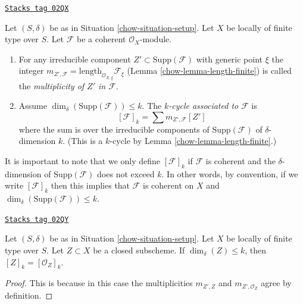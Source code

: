 \begin{definition}
\label{chow-definition-cycle-associated-to-coherent-sheaf}
\href{https://stacks.math.columbia.edu/tag/02QX}{\texttt{Stacks tag 02QX}}

Let $(S, \delta)$ be as in Situation \ref{chow-situation-setup}.
Let $X$ be locally of finite type over $S$.
Let $\mathcal{F}$ be a coherent $\mathcal{O}_X$-module.
\begin{enumerate}
\item For any irreducible component $Z' \subset \text{Supp}(\mathcal{F})$
with generic point $\xi$ the integer
$m_{Z', \mathcal{F}} = \text{length}_{\mathcal{O}_{X, \xi}} \mathcal{F}_\xi$
(Lemma \ref{chow-lemma-length-finite})
is called the {\it multiplicity of $Z'$ in $\mathcal{F}$}.
\item Assume $\dim_\delta(\text{Supp}(\mathcal{F})) \leq k$.
The {\it $k$-cycle associated to $\mathcal{F}$} is
$$
[\mathcal{F}]_k
=
\sum m_{Z', \mathcal{F}}[Z']
$$
where the sum is over the irreducible components of
$\text{Supp}(\mathcal{F})$ of $\delta$-dimension $k$.
(This is a $k$-cycle by Lemma \ref{chow-lemma-length-finite}.)
\end{enumerate}
\end{definition}

It is important to note that we only define $[\mathcal{F}]_k$
if $\mathcal{F}$ is coherent and the $\delta$-dimension
of $\text{Supp}(\mathcal{F})$ does not exceed $k$. In other words,
by convention, if we write $[\mathcal{F}]_k$ then this implies that
$\mathcal{F}$ is coherent on $X$ and
$\dim_\delta(\text{Supp}(\mathcal{F})) \leq k$.

\begin{lemma}
\label{chow-lemma-cycle-closed-coherent}
\href{https://stacks.math.columbia.edu/tag/02QY}{\texttt{Stacks tag 02QY}}

Let $(S, \delta)$ be as in Situation \ref{chow-situation-setup}.
Let $X$ be locally of finite type over $S$.
Let $Z \subset X$ be a closed subscheme.
If $\dim_\delta(Z) \leq k$, then $[Z]_k = [{\mathcal O}_Z]_k$.
\end{lemma}

\begin{proof}
This is because in this case the multiplicities $m_{Z', Z}$ and
$m_{Z', \mathcal{O}_Z}$ agree by definition.
\end{proof}

